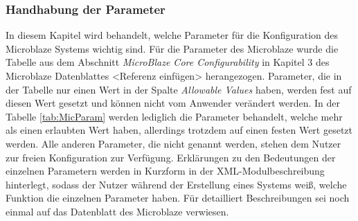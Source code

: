 \subsubsection{Handhabung der Parameter}
In diesem Kapitel wird behandelt, welche Parameter für die Konfiguration des Microblaze Systems wichtig sind.
Für die Parameter des Microblaze wurde die Tabelle aus dem Abschnitt \textit{MicroBlaze Core Configurability} in Kapitel 3 des Microblaze Datenblattes <Referenz einfügen> herangezogen. Parameter, die in der Tabelle nur einen Wert in der Spalte \textit{Allowable Values} haben, werden fest auf diesen Wert gesetzt und können nicht vom Anwender verändert werden. In der Tabelle \ref{tab:MicParam} werden lediglich die Parameter behandelt, welche mehr als einen erlaubten Wert haben, allerdings trotzdem auf einen festen Wert gesetzt werden. Alle anderen Parameter, die nicht genannt werden, stehen dem Nutzer zur freien Konfiguration zur Verfügung. Erklärungen zu den Bedeutungen der einzelnen Parametern werden in Kurzform in der XML-Modulbeschreibung hinterlegt, sodass der Nutzer während der Erstellung eines Systems weiß, welche Funktion die einzelnen Parameter haben. Für detailliert Beschreibungen sei noch einmal auf das Datenblatt des Microblaze verwiesen.
